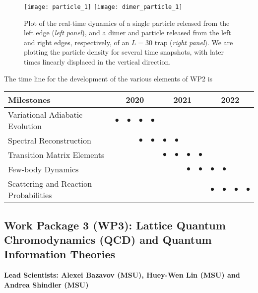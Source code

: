 \documentclass[11pt]{article}
\begin{document}
\begin{figure}[hbtp]
\texttt{[image: particle\_1]}
\texttt{[image: dimer\_particle\_1]}
\caption{Plot of the real-time dynamics of a single particle released from the left edge (\emph{left panel}), and a dimer and particle released from the left and right edges, respectively, of an $L=30$ trap (\emph{right panel}).  We are plotting the particle density for several time snapshots, with later times linearly displaced in the vertical direction.}
\label{particle}
\end{figure}
 

 The time line for the development of the various elements of WP2 is
\begin{footnotesize}
\begin{center}
\begin{tabular}{|l|c|c|c|c|c|c|c|c|c|c|c|c|}
\hline
\multicolumn{1}{|l}{Milestones } & \multicolumn{4}{|c|}{ 2020 } & \multicolumn{4}{c|}{ 2021 } & \multicolumn{4}{c|}{ 2022 } \\
\hline
Variational Adiabatic Evolution &$\bullet$ &$\bullet$ &$\bullet$ &$\bullet$ & & & & & & & &  \\
\hline
Spectral Reconstruction & & & $\bullet$ &$\bullet$ &$\bullet$ &$\bullet$ & & & & & &  \\
\hline
Transition Matrix Elements & & & & & $\bullet$ &$\bullet$ &$\bullet$ &$\bullet$ & & & &   \\
\hline
Few-body Dynamics & & & & & & & $\bullet$ &$\bullet$ &$\bullet$ &$\bullet$ & &\\
\hline
Scattering and Reaction Probabilities & & & & & & & & & $\bullet$ &$\bullet$ &$\bullet$ &$\bullet$ \\
\hline

\end{tabular}
\end{center}
\end{footnotesize}

\subsection{Work Package 3 (WP3): Lattice Quantum Chromodynamics (QCD) and Quantum Information Theories}
{\bf Lead Scientists: Alexei Bazavov (MSU), Huey-Wen Lin (MSU) and Andrea Shindler (MSU)}
\end{document}
